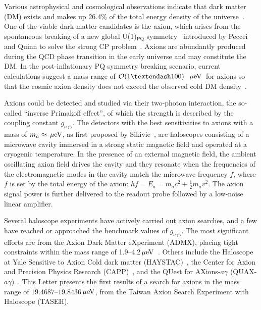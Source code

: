 \documentclass[%
 reprint,prl, %
superscriptaddress,
 amsmath,amssymb,
 aps,
]{revtex4-2}
\newcommand{\bgagg}{\ensuremath{g_{a\gamma\gamma}}}
\newcommand{\ma}{\ensuremath{m_a}}
\newcommand{\muevcc}{\ensuremath{\,\mu\text{e\hspace{-.08em}V}}}
\newcommand{\mlo}{\ensuremath{19.4687}}
\newcommand{\mhi}{\ensuremath{19.8436}}
\begin{document}
Various astrophysical and cosmological observations indicate that dark matter 
(DM) exists and makes up 26.4\% of the total energy density of the 
universe~\cite{DMI,DMII,DMIII,DMIV,PDG}. One of the viable dark matter 
candidates is the axion, which arises from the spontaneous breaking of a new 
global U(1)$_\mathrm{PQ}$ symmetry~\cite{strongCPI}  
introduced by Peccei and Quinn to solve the strong CP 
problem~\cite{strongCPI,strongCPII,strongCPIII}. 
Axions are abundantly produced during the QCD phase transition in 
the early universe and may constitute the DM. 
In the post-inflationary PQ symmetry breaking scenario, 
current calculations suggest a mass range of 
${\cal O}(1–100)$~\muevcc\ for axions so that the cosmic axion density does 
not exceed the 
observed cold DM density~\cite{QCDCalI,QCDCalII,QCDCalIII,QCDCalIV,QCDCalV,QCDCalVI,QCDCalVII,QCDCalVIII,QCDCalIX,QCDCalX,QCDCalXI,QCDCalXII,QCDCalXIII}. 
%

Axions could be detected and studied via their two-photon interaction, the
so-called ``inverse Primakoff effect'', of which the strength 
is described by the coupling constant \bgagg. 
The detectors with the best sensitivities to axions with a mass of 
$\ma\approx \muevcc$, as first proposed by 
Sikivie~\cite{SikivieI,SikivieII},  
are haloscopes consisting of a microwave cavity immersed in a strong static 
magnetic field and operated at a cryogenic temperature. 
In the presence of an external magnetic field, the ambient oscillating axion 
field drives the cavity and they resonate when the frequencies of the 
electromagnetic 
modes in the cavity match the microwave frequency $f$, where $f$ is set by 
the total energy of the axion: $hf=E_a=\ma c^2 + \frac{1}{2}\ma v^2$. The 
axion signal power is further delivered 
to the readout probe followed by a low-noise linear amplifier. 

Several haloscope experiments have actively carried out axion searches, and 
a few have reached or approached the benchmark values of \bgagg. 
The most significant efforts are from 
the Axion Dark Matter 
eXperiment (ADMX), placing tight constraints within the mass range of 
1.9--4.2\muevcc~\cite{ADMXI,ADMXII,ADMXIII,ADMXIV,ADMXV,ADMXVI,ADMXVII}. 
Others include the Haloscope at Yale Sensitive to Axion Cold dark matter 
(HAYSTAC)~\cite{HAYSTACIII,HAYSTACIV,HAYSTACI}, the Center 
for Axion and Precision Physics Research (CAPP)~\cite{CAPPII,CAPPIII,CAPPI}, 
and the QUest for AXions-$a\gamma$ (QUAX-$a\gamma$)~\cite{QUAX}. 
%
This Letter presents the first results 
of a search for axions in the mass range of \mlo--\mhi\muevcc, 
from the Taiwan Axion Search Experiment with Haloscope (TASEH). 
\end{document}
